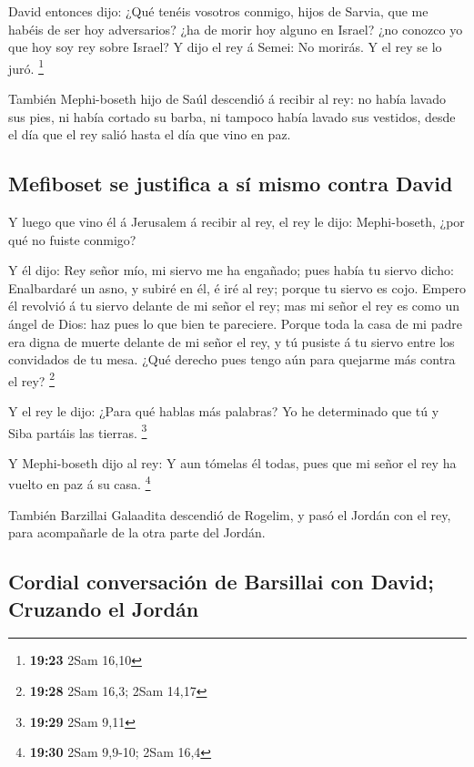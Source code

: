  David entonces dijo: ¿Qué tenéis vosotros conmigo, hijos
de Sarvia, que me habéis de ser hoy adversarios? ¿ha de morir hoy alguno
en Israel? ¿no conozco yo que hoy soy rey sobre Israel? 
Y dijo el rey á Semei: No morirás. Y el rey se lo juró. \footnote{\textbf{19:23}
  2Sam 16,10}

 También Mephi-boseth hijo de Saúl descendió á recibir al
rey: no había lavado sus pies, ni había cortado su barba, ni tampoco
había lavado sus vestidos, desde el día que el rey salió hasta el día
que vino en paz.

\hypertarget{mefiboset-se-justifica-a-suxed-mismo-contra-david}{%
\subsection{Mefiboset se justifica a sí mismo contra
David}\label{mefiboset-se-justifica-a-suxed-mismo-contra-david}}

 Y luego que vino él á Jerusalem á recibir al rey, el rey
le dijo: Mephi-boseth, ¿por qué no fuiste conmigo?

 Y él dijo: Rey señor mío, mi siervo me ha engañado; pues
había tu siervo dicho: Enalbardaré un asno, y subiré en él, é iré al
rey; porque tu siervo es cojo.  Empero él revolvió á tu
siervo delante de mi señor el rey; mas mi señor el rey es como un ángel
de Dios: haz pues lo que bien te pareciere.  Porque toda
la casa de mi padre era digna de muerte delante de mi señor el rey, y tú
pusiste á tu siervo entre los convidados de tu mesa. ¿Qué derecho pues
tengo aún para quejarme más contra el rey? \footnote{\textbf{19:28} 2Sam
  16,3; 2Sam 14,17}

 Y el rey le dijo: ¿Para qué hablas más palabras? Yo he
determinado que tú y Siba partáis las tierras. \footnote{\textbf{19:29}
  2Sam 9,11}

 Y Mephi-boseth dijo al rey: Y aun tómelas él todas, pues
que mi señor el rey ha vuelto en paz á su casa. \footnote{\textbf{19:30}
  2Sam 9,9-10; 2Sam 16,4}

 También Barzillai Galaadita descendió de Rogelim, y pasó
el Jordán con el rey, para acompañarle de la otra parte del Jordán.

\hypertarget{cordial-conversaciuxf3n-de-barsillai-con-david-cruzando-el-jorduxe1n}{%
\subsection{Cordial conversación de Barsillai con David; Cruzando el
Jordán}\label{cordial-conversaciuxf3n-de-barsillai-con-david-cruzando-el-jorduxe1n}}

